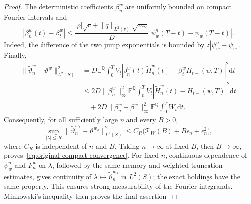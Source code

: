 \documentclass[10pt,a4paper]{amsart}
\newcommand{\E}{\mathbb{E}}
\newcommand{\Q}{\mathbb{Q}}
\newcommand{\dd}{\mathrm{d}}
\begin{document}
\begin{proof}
The deterministic coefficients $\beta_n^w$ are uniformly bounded on
compact Fourier intervals and
\[
 |\beta_n^w(t)-\beta_t^w|
 \leq\frac{|\rho|\sqrt c+\|q\|_{L^2(\nu)}\sqrt{m_2}}{D}
       |\psi_w^n(T-t)-\psi_w(T-t)|.
\]
Indeed, the difference of the two jump exponentials is bounded by
$z|\psi_w^n-\psi_w|$. Finally,
\begin{align*}
 \|\widetilde\vartheta_n^w-\vartheta^w\|_{L^2(S)}^2
 &=D\E^\Q\int_0^T V_t
       |\beta_n^w(t)\widetilde H_n^w(t)-\beta_t^wH_{t-}(w,T)|^2\dd t\\
 &\leq 2D\|\beta_n^w\|_\infty^2
       \E^\Q\int_0^T V_t|\widetilde H_n^w(t)-H_{t-}(w,T)|^2\dd t\\
 &\quad+2D\|\beta_n^w-\beta^w\|_\infty^2
       \E^\Q\int_0^T W_t\dd t.
\end{align*}
Consequently, for all sufficiently large $n$ and every $B>0$,
\begin{equation}
\label{eq:original-weighted-error-bound}
 \sup_{|\lambda|\leq R}
 \|\widetilde\vartheta_n^{w_\lambda}-\vartheta^{w_\lambda}\|_{L^2(S)}^2
 \leq C_R\bigl(\mathcal T_W(B)+B\epsilon_n+\epsilon_n^2\bigr),
\end{equation}
where $C_R$ is independent of $n$ and $B$. Taking $n\to\infty$ at fixed
$B$, then $B\to\infty$, proves~\eqref{eq:original-compact-convergence}.
For fixed $n$, continuous dependence of $\psi_w^n$ and
$F_n^w$ on $\lambda$, followed by the same memory and weighted truncation
estimates, gives continuity of
$\lambda\mapsto\widetilde\vartheta_n^{w_\lambda}$ in $L^2(S)$; the exact
holdings have the same property. This ensures strong measurability of the
Fourier integrands. Minkowski's inequality then
proves the final assertion.
\end{proof}
\end{document}
